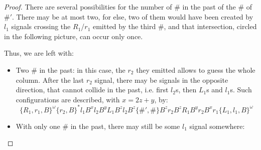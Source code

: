 \documentclass{jac}
\theoremstyle{definition}
\begin{document}
  \begin{proof}
    There are several possibilities for the number of $\#$ in the past of the
    $\#$ of $\#'$. There may be at most two, for else, two of them would have been
    created by $l_1$ signals crossing the $R_1$/$r_1$ emitted by the third $\#$,
    and that intersection, circled in the following picture, can occur only once.
    \begin{center}
    \end{center}
    Thus, we are left with:

    \begin{itemize}
    \item Two $\#$ in the past: in this case, the $r_2$ they emitted allows to
      guess the whole column.  After the last $r_2$ signal, there may be signals
      in the opposite direction, that cannot collide in the past, i.e.  first
      $l_2$s, then $L_1$s and $l_1$s. Such configurations are described, with
      $x=2z+y$, by:
        $$\{R_1,r_1,B\}^\omega\{r_2,B\}^*l_1B^xl_2B^yL_1B^zl_2B^z\{\#',\#\}
        B^zr_2B^zR_1B^yr_2B^xr_1\{L_1,l_1,B\}^\omega$$

      \item With only one $\#$ in the past, there may still be some $l_1$ signal
        somewhere:
        \begin{center}
\end{center}
\end{itemize}
\end{proof}
\end{document}
